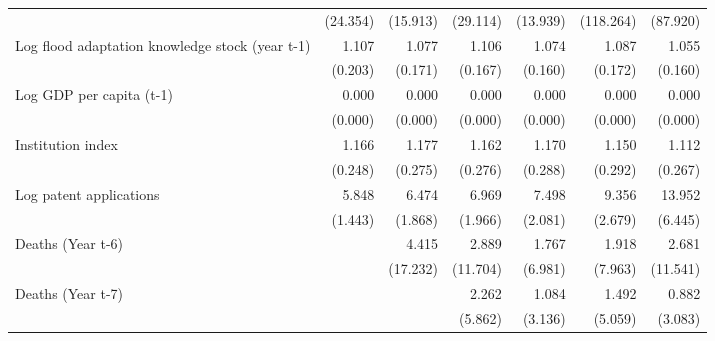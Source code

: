 \begin{table}[htbp]
\begin{tabular}{l*{6}{D{.}{.}{-1}}}
                    &    (24.354)         &    (15.913)         &    (29.114)         &    (13.939)         &   (118.264)         &    (87.920)         \\
\addlinespace
Log flood adaptation knowledge stock (year t-1)&       1.107         &       1.077         &       1.106         &       1.074         &       1.087         &       1.055         \\
                    &     (0.203)         &     (0.171)         &     (0.167)         &     (0.160)         &     (0.172)         &     (0.160)         \\
\addlinespace
Log GDP per capita (t-1)&       0.000\sym{**} &       0.000\sym{**} &       0.000\sym{***}&       0.000\sym{**} &       0.000\sym{***}&       0.000\sym{**} \\
                    &     (0.000)         &     (0.000)         &     (0.000)         &     (0.000)         &     (0.000)         &     (0.000)         \\
\addlinespace
Institution index   &       1.166         &       1.177         &       1.162         &       1.170         &       1.150         &       1.112         \\
                    &     (0.248)         &     (0.275)         &     (0.276)         &     (0.288)         &     (0.292)         &     (0.267)         \\
\addlinespace
Log patent applications&       5.848\sym{***}&       6.474\sym{***}&       6.969\sym{***}&       7.498\sym{***}&       9.356\sym{***}&      13.952\sym{***}\\
                    &     (1.443)         &     (1.868)         &     (1.966)         &     (2.081)         &     (2.679)         &     (6.445)         \\
\addlinespace
Deaths (Year t-6)   &                     &       4.415         &       2.889         &       1.767         &       1.918         &       2.681         \\
                    &                     &    (17.232)         &    (11.704)         &     (6.981)         &     (7.963)         &    (11.541)         \\
\addlinespace
Deaths (Year t-7)   &                     &                     &       2.262         &       1.084         &       1.492         &       0.882         \\
                    &                     &                     &     (5.862)         &     (3.136)         &     (5.059)         &     (3.083)         \\

\end{tabular}
\end{table}

